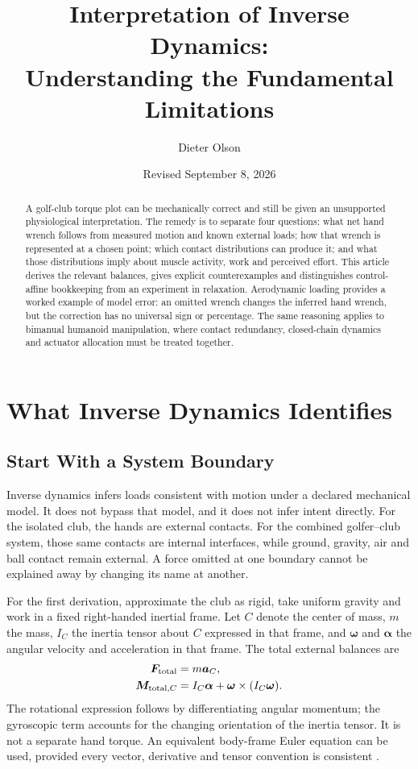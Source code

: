 \documentclass[11pt,a4paper]{article}
\title{Interpretation of Inverse Dynamics:\\Understanding the Fundamental Limitations}
\author{Dieter Olson}
\date{Revised September 8, 2026}
\newcommand{\vect}[1]{\boldsymbol{#1}}
\begin{document}
\maketitle
\begin{abstract}
A golf-club torque plot can be mechanically correct and still be given an unsupported physiological interpretation. The remedy is to separate four questions: what net hand wrench follows from measured motion and known external loads; how that wrench is represented at a chosen point; which contact distributions can produce it; and what those distributions imply about muscle activity, work and perceived effort. This article derives the relevant balances, gives explicit counterexamples and distinguishes control-affine bookkeeping from an experiment in relaxation. Aerodynamic loading provides a worked example of model error: an omitted wrench changes the inferred hand wrench, but the correction has no universal sign or percentage. The same reasoning applies to bimanual humanoid manipulation, where contact redundancy, closed-chain dynamics and actuator allocation must be treated together.
\end{abstract}
\tableofcontents

\section{What Inverse Dynamics Identifies}
\subsection{Start With a System Boundary}
Inverse dynamics infers loads consistent with motion under a declared mechanical model. It does not bypass that model, and it does not infer intent directly. For the isolated club, the hands are external contacts. For the combined golfer--club system, those same contacts are internal interfaces, while ground, gravity, air and ball contact remain external. A force omitted at one boundary cannot be explained away by changing its name at another.

For the first derivation, approximate the club as rigid, take uniform gravity and work in a fixed right-handed inertial frame. Let $C$ denote the center of mass, $m$ the mass, $I_C$ the inertia tensor about $C$ expressed in that frame, and $\vect\omega$ and $\vect\alpha$ the angular velocity and acceleration in that frame. The total external balances are
\begin{align}
\vect F_{\rm total}&=m\vect a_C,\label{eq:force_balance}\\
\vect M_{{\rm total},C}&=I_C\vect\alpha+
\vect\omega\times(I_C\vect\omega).\label{eq:moment_balance}
\end{align}
The rotational expression follows by differentiating angular momentum; the gyroscopic term accounts for the changing orientation of the inertia tensor. It is not a separate hand torque. An equivalent body-frame Euler equation can be used, provided every vector, derivative and tensor convention is consistent \cite{lynch,featherstone}.
\end{document}
